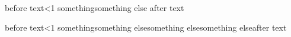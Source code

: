 before text\ifodd\x<1 something\or something else \fi  after text

before text\ifodd\x<1 something\or something else\or something else\or something else\fi after text
